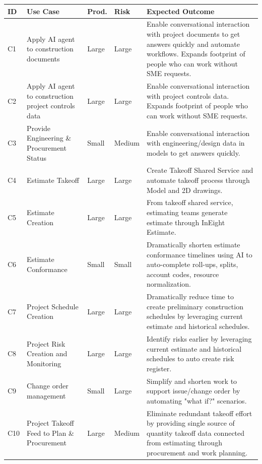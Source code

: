 \documentclass[11pt, letterpaper]{article}
\begin{document}
{\footnotesize
\setlength{\tabcolsep}{4pt}
\begin{tabularx}{\textwidth}{@{} >{\raggedright\arraybackslash}p{0.9cm} >{\raggedright\arraybackslash}p{3.8cm} >{\raggedright\arraybackslash}p{1.3cm} >{\raggedright\arraybackslash}p{1.3cm} X @{}}
\toprule
\textbf{ID} & \textbf{Use Case} & \textbf{Prod.} & \textbf{Risk} & \textbf{Expected Outcome} \\
\midrule
C1 & Apply AI agent to construction documents & Large & Large & Enable conversational interaction with project documents to get answers quickly and automate workflows. Expands footprint of people who can work without SME requests. \\
\midrule
C2 & Apply AI agent to construction project controls data & Large & Large & Enable conversational interaction with project controls data. Expands footprint of people who can work without SME requests. \\
\midrule
C3 & Provide Engineering \& Procurement Status & Small & Medium & Enable conversational interaction with engineering/design data in models to get answers quickly. \\
\midrule
C4 & Estimate Takeoff & Large & Large & Create Takeoff Shared Service and automate takeoff process through Model and 2D drawings. \\
\midrule
C5 & Estimate Creation & Large & Large & From takeoff shared service, estimating teams generate estimate through InEight Estimate. \\
\midrule
C6 & Estimate Conformance & Small & Small & Dramatically shorten estimate conformance timelines using AI to auto-complete roll-ups, splits, account codes, resource normalization. \\
\midrule
C7 & Project Schedule Creation & Large & Large & Dramatically reduce time to create preliminary construction schedules by leveraging current estimate and historical schedules. \\
\midrule
C8 & Project Risk Creation and Monitoring & Large & Large & Identify risks earlier by leveraging current estimate and historical schedules to auto create risk register. \\
\midrule
C9 & Change order management & Small & Large & Simplify and shorten work to support issue/change order by automating "what if?" scenarios. \\
\midrule
C10 & Project Takeoff Feed to Plan \& Procurement & Large & Medium & Eliminate redundant takeoff effort by providing single source of quantity takeoff data connected from estimating through procurement and work planning. \\

\end{tabularx}}
\end{document}
